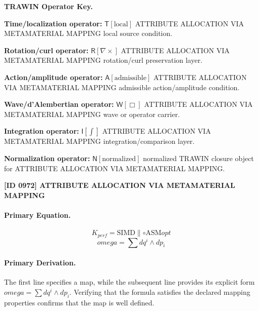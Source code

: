 \par\vspace{0.45\baselineskip}
\noindent\begin{minipage}[t]{\linewidth}
\begingroup
\small
\raggedright
\textbf{TRAWIN Operator Key.}\par
\noindent\textbf{Time/localization operator:} $\mathsf{T}\!\left[\mathrm{local}\right]$ ATTRIBUTE ALLOCATION VIA METAMATERIAL MAPPING local source condition.\par
\noindent\textbf{Rotation/curl operator:} $\mathsf{R}\!\left[\nabla\times\right]$ ATTRIBUTE ALLOCATION VIA METAMATERIAL MAPPING rotation/curl preservation layer.\par
\noindent\textbf{Action/amplitude operator:} $\mathsf{A}\!\left[\mathrm{admissible}\right]$ ATTRIBUTE ALLOCATION VIA METAMATERIAL MAPPING admissible action/amplitude condition.\par
\noindent\textbf{Wave/d'Alembertian operator:} $\mathsf{W}\!\left[\Box\right]$ ATTRIBUTE ALLOCATION VIA METAMATERIAL MAPPING wave or operator carrier.\par
\noindent\textbf{Integration operator:} $\mathsf{I}\!\left[\int\right]$ ATTRIBUTE ALLOCATION VIA METAMATERIAL MAPPING integration/comparison layer.\par
\noindent\textbf{Normalization operator:} $\mathsf{N}\!\left[\mathrm{normalized}\right]$ normalized TRAWIN closure object for ATTRIBUTE ALLOCATION VIA METAMATERIAL MAPPING.\par
\endgroup
\end{minipage}

\clearpage
\noindent\textbf{[ID 0972] ATTRIBUTE ALLOCATION VIA METAMATERIAL MAPPING}\par
\vspace{0.35em}
\paragraph{Primary Equation.}
\[
K_{perf} = \text{SIMD} {\parallel} \circ \text{ASM} {opt}
\]
\[
omega = \sum dq^i \wedge dp_i
\]

\paragraph{Primary Derivation.}
The first line specifies a map, while the subsequent line provides its explicit form \( omega = \sum dq^i \wedge dp_i \). Verifying that the formula satisfies the declared mapping properties confirms that the map is well defined.
